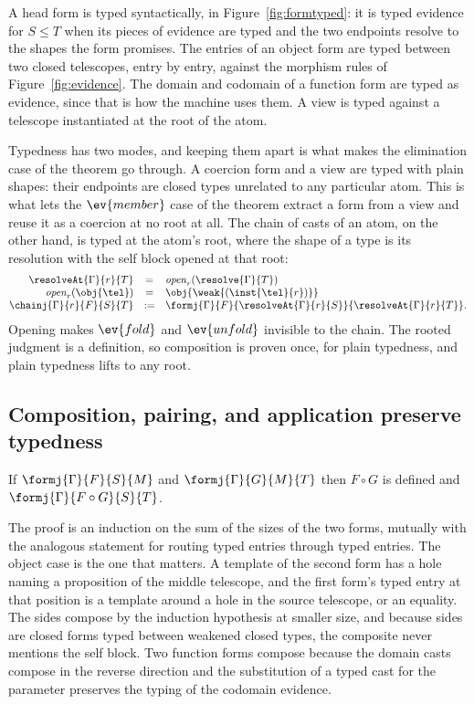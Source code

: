 A head form is typed syntactically, in Figure~\ref{fig:formtyped}: it is typed evidence for $S \le T$ when its pieces of evidence are typed and the two endpoints resolve to the shapes the form promises. The entries of an object form are typed between two closed telescopes, entry by entry, against the morphism rules of Figure~\ref{fig:evidence}. The domain and codomain of a function form are typed as evidence, since that is how the machine uses them. A view is typed against a telescope instantiated at the root of the atom.

Typedness has two modes, and keeping them apart is what makes the elimination case of the theorem go through. A coercion form and a view are typed with plain shapes: their endpoints are closed types unrelated to any particular atom. This is what lets the $\ev{member}$ case of the theorem extract a form from a view and reuse it as a coercion at no root at all. The chain of casts of an atom, on the other hand, is typed at the atom's root, where the shape of a type is its resolution with the self block opened at that root:
\[
\begin{array}{@{}rcl@{}}
\resolveAt{\Gamma}{r}{T} & = & \mathit{open}_r(\resolve{\Gamma}{T}) \\
\mathit{open}_r(\obj{\tel}) & = & \obj{\weak{(\inst{\tel}{r})}} \\
\chainj{\Gamma}{r}{F}{S}{T} & \mathrel{:=} & \formj{\Gamma}{F}{\resolveAt{\Gamma}{r}{S}}{\resolveAt{\Gamma}{r}{T}} .
\end{array}
\]
Opening makes $\ev{fold}$ and $\ev{unfold}$ invisible to the chain. The rooted judgment is a definition, so composition is proven once, for plain typedness, and plain typedness lifts to any root.

\subsection{Composition, pairing, and application preserve typedness}

\begin{lemma}[Composition]\label{lem:combine}
If $\formj{\Gamma}{F}{S}{M}$ and $\formj{\Gamma}{G}{M}{T}$ then $F \circ G$ is defined and $\formj{\Gamma}{F \circ G}{S}{T}$.
\end{lemma}

The proof is an induction on the sum of the sizes of the two forms, mutually with the analogous statement for routing typed entries through typed entries. The object case is the one that matters. A template of the second form has a hole naming a proposition of the middle telescope, and the first form's typed entry at that position is a template around a hole in the source telescope, or an equality. The sides compose by the induction hypothesis at smaller size, and because sides are closed forms typed between weakened closed types, the composite never mentions the self block. Two function forms compose because the domain casts compose in the reverse direction and the substitution of a typed cast for the parameter preserves the typing of the codomain evidence.

